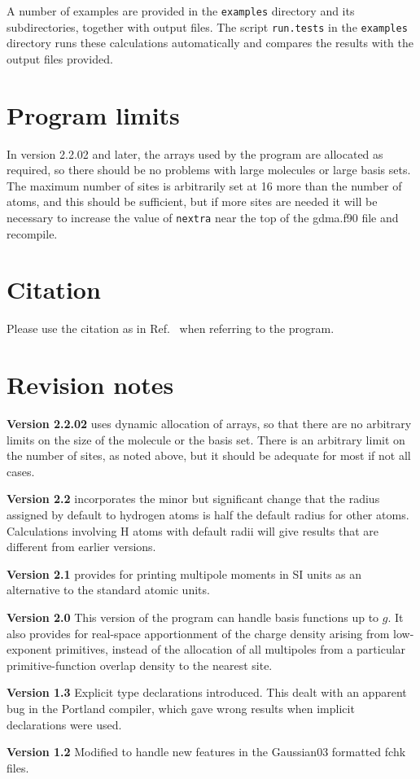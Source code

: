 \documentclass[12pt,txfonts]{paper}
\begin{document}
A number of examples are provided in the \verb/examples/ directory and
its subdirectories, together with output files. The script
\verb/run.tests/ in the \verb/examples/ directory runs these
calculations automatically and compares the results with the output
files provided.

\section{Program limits}

In version 2.2.02 and later, the arrays used by the program are allocated as
required, so there should be no problems with large molecules or large
basis sets. The maximum number of sites is arbitrarily set at 16 more
than the number of atoms, and this should be sufficient, but if more
sites are needed it will be necessary to increase the value of
\texttt{nextra} near the top of the gdma.f90 file and recompile.


\section{Citation}

Please use the citation as in Ref.~ when referring
to the program.


\section{Revision notes}

\textbf{Version 2.2.02} uses dynamic allocation of arrays, so that
there are no arbitrary limits on the size of the molecule or the basis
set. There is an arbitrary limit on the number of sites, as noted
above, but it should be adequate for most if not all cases.

\textbf{Version 2.2} incorporates the minor but significant change
that the radius assigned by default to hydrogen atoms is half the default
radius for other atoms. Calculations involving H atoms with default
radii will give results that are different from earlier versions.

\textbf{Version 2.1} provides for printing multipole moments in SI
units as an alternative to the standard atomic units.

\textbf{Version 2.0} This version of the program can handle basis
functions up to $g$. It also provides for real-space apportionment
of the charge density arising from low-exponent primitives, instead
of the allocation of all multipoles from a particular
primitive-function overlap density to the nearest site.

\textbf{Version 1.3} Explicit type declarations introduced. This dealt
with an apparent bug in the Portland compiler, which gave wrong
results when implicit declarations were used.

\textbf{Version 1.2} Modified to handle new features in the Gaussian03
formatted fchk files.

\pagebreak

\end{document}
